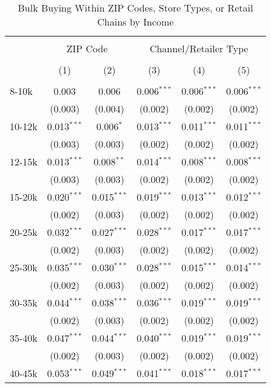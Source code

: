 \begin{table}[!htbp] \centering
  \caption{Bulk Buying Within ZIP Codes, Store Types, or Retail Chains by Income}
  \label{tab:discountingBehaviorFEAll}
\begin{tabular}{@{\extracolsep{5pt}}lccccc}
\\[-1.8ex]\hline
\hline \\[-1.8ex]
 & \multicolumn{2}{c}{ZIP Code} & \multicolumn{3}{c}{Channel/Retailer Type} \\
\\[-1.8ex] & (1) & (2) & (3) & (4) & (5)\\
\hline \\[-1.8ex]
 8-10k & 0.003 & 0.006 & 0.006$^{***}$ & 0.006$^{***}$ & 0.006$^{***}$ \\
  & (0.003) & (0.004) & (0.002) & (0.002) & (0.002) \\
  10-12k & 0.013$^{***}$ & 0.006$^{*}$ & 0.013$^{***}$ & 0.011$^{***}$ & 0.011$^{***}$ \\
  & (0.003) & (0.003) & (0.002) & (0.002) & (0.002) \\
  12-15k & 0.013$^{***}$ & 0.008$^{**}$ & 0.014$^{***}$ & 0.008$^{***}$ & 0.008$^{***}$ \\
  & (0.003) & (0.003) & (0.002) & (0.002) & (0.002) \\
  15-20k & 0.020$^{***}$ & 0.015$^{***}$ & 0.019$^{***}$ & 0.013$^{***}$ & 0.012$^{***}$ \\
  & (0.002) & (0.003) & (0.002) & (0.002) & (0.002) \\
  20-25k & 0.032$^{***}$ & 0.027$^{***}$ & 0.028$^{***}$ & 0.017$^{***}$ & 0.017$^{***}$ \\
  & (0.002) & (0.003) & (0.002) & (0.002) & (0.002) \\
  25-30k & 0.035$^{***}$ & 0.030$^{***}$ & 0.028$^{***}$ & 0.015$^{***}$ & 0.014$^{***}$ \\
  & (0.002) & (0.003) & (0.002) & (0.002) & (0.002) \\
  30-35k & 0.044$^{***}$ & 0.038$^{***}$ & 0.036$^{***}$ & 0.019$^{***}$ & 0.019$^{***}$ \\
  & (0.002) & (0.003) & (0.002) & (0.002) & (0.002) \\
  35-40k & 0.047$^{***}$ & 0.044$^{***}$ & 0.040$^{***}$ & 0.019$^{***}$ & 0.019$^{***}$ \\
  & (0.002) & (0.003) & (0.002) & (0.002) & (0.002) \\
  40-45k & 0.053$^{***}$ & 0.049$^{***}$ & 0.041$^{***}$ & 0.018$^{***}$ & 0.017$^{***}$ \\

\end{tabular}
\end{table}
